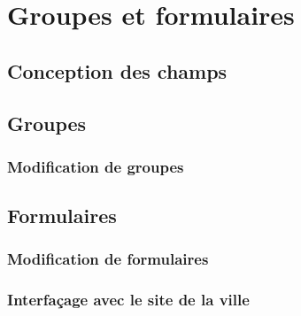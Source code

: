 \section{Groupes et formulaires}\label{sec:groupes-et-formulaires}

\subsection{Conception des champs}\label{subsec:conception-des-champs}

\subsection{Groupes}\label{subsec:groupes}

\subsubsection{Modification de groupes}

\subsection{Formulaires}\label{subsec:formulaires}

\subsubsection{Modification de formulaires}

\subsubsection{Interfaçage avec le site de la ville}
